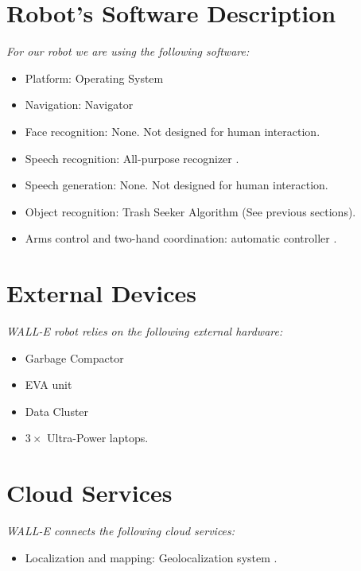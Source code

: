 \section*{Robot's Software Description}

\textit{For our robot we are using the following software:}

\begin{itemize}
	\item Platform: \BnL Operating System
	\item Navigation: \BnL Navigator
	\item Face recognition: None. Not designed for human interaction.
	\item Speech recognition: \BnL All-purpose recognizer \cite{bnl1}.
	\item Speech generation: None. Not designed for human interaction.
	\item Object recognition: \BnL Trash Seeker Algorithm (See previous sections).
	\item Arms control and two-hand coordination: \BnL automatic controller \cite{bnl2}.
\end{itemize}

\section*{External Devices}

\textit{WALL-E robot relies on the following external hardware:}

\begin{itemize}
	\item \BnL Garbage Compactor
	\item \BnL EVA unit
	\item \BnL Data Cluster
	\item $3 \times$ \BnL Ultra-Power laptops.
\end{itemize}

\section*{Cloud Services}

\textit{WALL-E connects the following cloud services:}
\begin{itemize}
	\item Localization and mapping: \BnL Geolocalization system \cite{bnl3}.
\end{itemize}